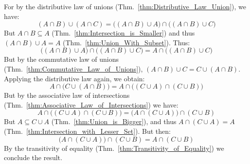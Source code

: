         \begin{bproof}
            For by the distributive law of unions
            (Thm.~\ref{thm:Distributive_Law_Union}), we have:
            \begin{equation}
                    (A\cap{B})\cup(A\cap{C})
                    =\Big((A\cap{B})\cup{A}\Big)\cap\Big((A\cap{B})\cup{C}\Big)
            \end{equation}
            But $A\cap{B}\subseteq{A}$ (Thm.~\ref{thm:Intersection_is_Smaller})
            and thus $(A\cap{B})\cup{A}=A$ (Thm.~\ref{thm:Union_With_Subset}).
            Thus:
            \begin{equation}
                \Big((A\cap{B})\cup{A}\Big)\cap\Big((A\cap{B})\cup{C}\Big)
                =A\cap\Big((A\cap{B})\cup{C}\Big)
            \end{equation}
            But by the commutative law of unions
            (Thm.~\ref{thm:Commutative_Law_of_Unions}),
            $(A\cap{B})\cup{C}=C\cup(A\cap{B})$. Applying the distributive law
            again, we obtain:
            \begin{equation}
                A\cap\Big(C\cup(A\cap{B})\Big)
                =A\cap\Big((C\cup{A})\cap(C\cup{B})\Big)
            \end{equation}
            But by the associative law of intersections
            (Thm.~\ref{thm:Associative_Law_of_Intersections}) we have:
            \begin{equation}
                A\cap\Big((C\cup{A})\cap(C\cup{B})\Big)
                =\Big(A\cap(C\cup{A})\Big)\cap(C\cup{B})
            \end{equation}
            But $A\subseteq{C}\cup{A}$ (Thm.~\ref{thm:Union_is_Bigger}), and
            thus $A\cap(C\cup{A})=A$
            (Thm.~\ref{thm:Intersection_with_Lesser_Set}). But then:
            \begin{equation}
                \Big(A\cap(C\cup{A})\Big)\cap(C\cup{B})
                =A\cap(C\cup{B})
            \end{equation}
            By the transitivity of equality
            (Thm.~\ref{thm:Transitivity_of_Equality}) we conclude the result.
        \end{bproof}

